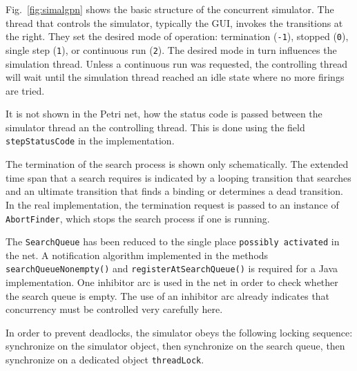 
Fig.~\ref{fig:simalgpn} shows the basic structure of the
concurrent simulator. The thread that controls the simulator,
typically the GUI, invokes the transitions at the right. 
They set the desired mode of operation: 
termination (\texttt{-1}),
stopped (\texttt{0}),
single step (\texttt{1}), or
continuous run (\texttt{2}).
The desired mode in turn influences the simulation thread.
Unless a continuous run was requested, the controlling thread 
will wait until the simulation thread reached an idle state where no more
firings are tried.

It is not shown in the Petri net, how the status code is passed between
the simulator thread an the controlling thread.
This is done using the field \texttt{stepStatusCode} in the implementation.

The termination of the search process is shown only schematically.
The extended time span that a search requires is indicated by
a looping transition that searches and an ultimate transition
that finds a binding or determines a dead transition.
In the real implementation, the termination request is passed to an
instance of \texttt{AbortFinder}, which stops the search process if
one is running. 

The \texttt{SearchQueue} has been reduced to the single place
\texttt{possibly activated} in the net. A notification algorithm
implemented in the methods \texttt{searchQueueNonempty()}
and \texttt{registerAtSearchQueue()} is required for a Java 
implementation. One inhibitor arc is used in the net
in order to check whether the search queue is empty.
The use of an inhibitor arc already indicates that
concurrency must be controlled very carefully here.

In order to prevent deadlocks, the simulator obeys the following
locking sequence: synchronize on the simulator object,
then synchronize on the search queue, then synchronize on
a dedicated object \texttt{threadLock}.
